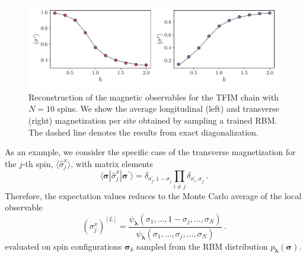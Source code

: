 \documentclass[submission, Phys, hidelnks]{SciPost}
\begin{document}
\begin{figure}[t]
    \centering{}
    \includegraphics[width=\columnwidth, trim={0 15 0 0}, clip]{obs.pdf}
    \caption{\label{tfim_magn} Reconstruction of the magnetic observables for the TFIM chain with $N=10$ spins. We show the average longitudinal (left) and transverse (right) magnetization per site obtained by sampling a trained RBM. The dashed line denotes the results from exact diagonalization.}
\end{figure}

As an example, we consider the specific case of the transverse magnetization for the $j$-th spin, $\langle\hat{\sigma}^x_j\rangle$, with matrix elements
\begin{equation}
    \langle\bm{\sigma}|\hat{\sigma}^x_j|\bm{\sigma}^{\prime}\rangle=\delta_{\sigma_j^\prime,1-\sigma_j}\prod_{i\ne j}\delta_{\sigma_i^\prime,\sigma_j}\:.
\end{equation}
Therefore, the expectation values reduces to the Monte Carlo average of the local observable
\begin{equation}
   (\sigma^x_j)^{[L]}=\frac{\psi_{\bm{\lambda}}(\sigma_1,\dots,1-\sigma_j,\dots,\sigma_N)}
    {\psi_{\bm{\lambda}}(\sigma_1,\dots,\sigma_j,\dots,\sigma_N)} 
\:.
\end{equation}
evaluated on spin configurations $\bm{\sigma}_k$ sampled from the RBM distribution $p_{\bm{\lambda}}(\bm{\sigma})$. 
\end{document}
